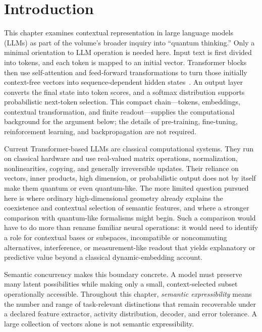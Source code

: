 \documentclass[
  aps,
  reprint,
  superscriptaddress,
  floatfix,
  nofootinbib,
  longbibliography
]{revtex4-2}
\begin{document}
\maketitle


\section{Introduction}
\label{sec:intro}

This chapter examines contextual representation in large language models
(LLMs) as part of the volume's broader inquiry into ``quantum thinking.''
Only a minimal orientation to LLM operation is needed here.  Input text is
first divided into tokens, and each token is mapped to an initial vector.
Transformer blocks then use self-attention and feed-forward transformations
to turn those initially context-free vectors into sequence-dependent hidden
states~\cite{Vaswani-2017-Attention}.  An output layer converts the final state into token scores, and a
softmax distribution supports probabilistic next-token selection.  This
compact chain---tokens, embeddings, contextual transformation, and finite
readout---supplies the computational background for the argument below; the
details of pre-training, fine-tuning, reinforcement learning, and
backpropagation are not required.

Current Transformer-based LLMs are classical computational systems.  They
run on classical hardware and use real-valued matrix operations,
normalization, nonlinearities, copying, and generally irreversible updates.
Their reliance on vectors, inner products, high dimension, or probabilistic
output does not by itself make them quantum or even quantum-like.  The more
limited question pursued here is where ordinary high-dimensional geometry
already explains the coexistence and contextual selection of semantic
features, and where a stronger comparison with quantum-like formalisms might
begin.  Such a comparison would have to do more than rename familiar neural
operations: it would need to identify a role for contextual bases or subspaces,
incompatible or noncommuting alternatives, interference, or
measurement-like readout that yields explanatory or predictive value beyond
a classical dynamic-embedding account.

Semantic concurrency makes this boundary concrete.  A model must preserve
many latent possibilities while making only a small, context-selected subset
operationally accessible.  Throughout this chapter, \emph{semantic
expressibility} means the number and range of task-relevant distinctions that
remain recoverable under a declared feature extractor, activity distribution,
decoder, and error tolerance.  A large collection of vectors alone is not
semantic expressibility.
\end{document}
